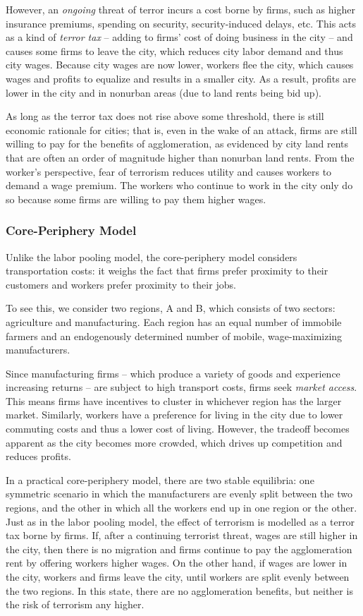 \documentclass[preprint,2p,12pt]{elsarticle}
\begin{document}
However, an \emph{ongoing} threat of terror incurs a cost borne by firms, such as higher insurance premiums, spending on security, security-induced delays, etc. This acts as a kind of \emph{terror tax} -- adding to firms' cost of doing business in the city -- and causes some firms to leave the city, which reduces city labor demand and thus city wages. Because city wages are now lower, workers flee the city, which causes wages and profits to equalize and results in a smaller city. As a result, profits are lower in the city and in nonurban areas (due to land rents being bid up). 

As long as the terror tax does not rise above some threshold, there is still economic rationale for cities; that is, even in the wake of an attack, firms are still willing to pay for the benefits of agglomeration, as evidenced by city land rents that are often an order of magnitude higher than nonurban land rents. From the worker's perspective, fear of terrorism reduces utility and causes workers to demand a wage premium. The workers who continue to work in the city only do so because some firms are willing to pay them higher wages.

\subsubsection{Core-Periphery Model}
Unlike the labor pooling model, the core-periphery model considers transportation costs: it weighs the fact that firms prefer proximity to their customers and workers prefer proximity to their jobs. 

To see this, we consider two regions, A and B, which consists of two sectors: agriculture and manufacturing. 
Each region has an equal number of immobile farmers and an endogenously determined number of mobile, wage-maximizing manufacturers.

Since manufacturing firms -- which produce a variety of goods and experience increasing returns -- are subject to high transport costs, firms seek \emph{market access}. This means firms have incentives to cluster in whichever region has the larger market. 
Similarly, workers have a preference for living in the city due to lower commuting costs and thus a lower cost of living. However, the tradeoff becomes apparent as the city becomes more crowded, which drives up competition and reduces profits.

In a practical core-periphery model, there are two stable equilibria: one symmetric scenario in which the manufacturers are evenly split between the two regions, and the other in which all the workers end up in one region or the other. Just as in the labor pooling model, the effect of terrorism is modelled as a terror tax borne by firms. If, after a continuing terrorist threat, wages are still higher in the city, then there is no migration and firms continue to pay the agglomeration rent by offering workers higher wages. On the other hand, if wages are lower in the city, workers and firms leave the city, until workers are split evenly between the two regions. In this state, there are no agglomeration benefits, but neither is the risk of terrorism any higher.
\end{document}
